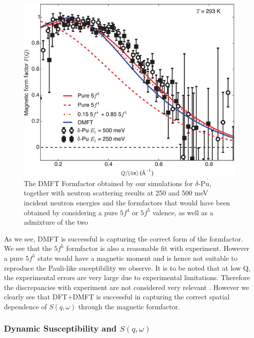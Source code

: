 \documentclass[10pt]{ruthesis}
\begin{document}
{\begin{figure}[H]
\includegraphics[scale=0.7]{Formfactor_Pu.jpg}
\caption{The DMFT Formfactor obtained by our simulations for $\delta$-Pu, together with neutron scattering results at 250 and 500 meV incident neutron energies and the formfactors that would have been obtained by considering a pure $5f^4$ or $5f^5$ valence, as well as a admixture of the two \label{Form_Pu}}
\end{figure}



 As we see, DMFT is successful is capturing the correct form of the formfactor. We see that the $5f^5$ formfactor is also a reasonable fit with experiment. However a pure $5f^5$ state would have a magnetic moment and is hence not suitable to reproduce the Pauli-like suceptibility we observe. It is to be noted that at low Q, the experimental errors are very large due to experimental limitations. Therefore the discrepancies with experiment are not considered very relevant . However we clearly see that DFT+DMFT is successful in capturing the correct spatial dependence of $S(q,\omega)$ through the magnetic formfactor. 




\subsubsection{Dynamic Susceptibility and $S(q,\omega)$}

}
\end{document}
